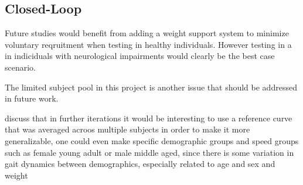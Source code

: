 \subsection{Closed-Loop}
Future studies would benefit from adding a weight support system to minimize voluntary reqruitment when testing in healthy individuals. However testing in a in indiciduals with neurological impairments would clearly be the best case scenario. 

The limited subject pool in this project is another issue that should be addressed in future work.

discuss that in further iterations it would be interesting to use a reference curve that was averaged acroos multiple subjects in order to make it more generalizable, one could even make specific demographic groups and speed groups such as female young adult or male middle aged, since there is some variation in gait dynamics between demographics, especially related to age and sex and weight

